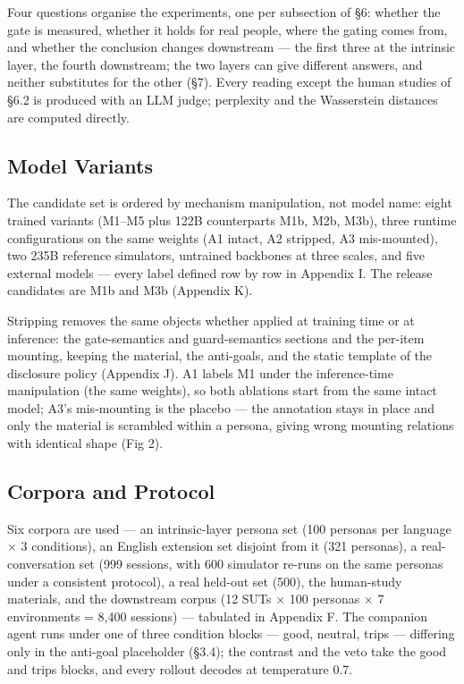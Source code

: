 \documentclass[letterpaper]{article}
\begin{document}
Four questions organise the experiments, one per subsection of \S{}6: whether the gate is measured, whether it holds for real people, where the gating comes from, and whether the conclusion changes downstream --- the first three at the intrinsic layer, the fourth downstream; the two layers can give different answers, and neither substitutes for the other (\S{}7). Every reading except the human studies of \S{}6.2 is produced with an LLM judge; perplexity and the Wasserstein distances are computed directly.


\subsection{Model Variants}

The candidate set is ordered by mechanism manipulation, not model name: eight trained variants (M1--M5 plus 122B counterparts M1b, M2b, M3b), three runtime configurations on the same weights (A1 intact, A2 stripped, A3 mis-mounted), two 235B reference simulators, untrained backbones at three scales, and five external models --- every label defined row by row in Appendix I. The release candidates are M1b and M3b (Appendix K).

Stripping removes the same objects whether applied at training time or at inference: the gate-semantics and guard-semantics sections and the per-item mounting, keeping the material, the anti-goals, and the static template of the disclosure policy (Appendix J). A1 labels M1 under the inference-time manipulation (the same weights), so both ablations start from the same intact model; A3's mis-mounting is the placebo --- the annotation stays in place and only the material is scrambled within a persona, giving wrong mounting relations with identical shape (Fig 2).


\subsection{Corpora and Protocol}

Six corpora are used --- an intrinsic-layer persona set (100 personas per language $\times$ 3 conditions), an English extension set disjoint from it (321 personas), a real-conversation set (999 sessions, with 600 simulator re-runs on the same personas under a consistent protocol), a real held-out set (500), the human-study materials, and the downstream corpus (12 SUTs $\times$ 100 personas $\times$ 7 environments = 8,400 sessions) --- tabulated in Appendix F. The companion agent runs under one of three condition blocks --- good, neutral, trips --- differing only in the anti-goal placeholder (\S{}3.4); the contrast and the veto take the good and trips blocks, and every rollout decodes at temperature 0.7.
\end{document}
